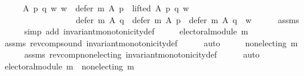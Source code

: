 \begin{isabellebody}
%
\isadelimproof
%
\endisadelimproof
%
\isatagproof
{}\isamarkupfalse%
\ {\isacharminus}{\kern0pt}\isanewline
\ \ \isamarkupfalse%
\ {\isachardoublequoteopen}{\isasymforall}A\ p\ q\ w{\isachardot}{\kern0pt}\ {\isacharparenleft}{\kern0pt}w\ {\isasymin}\ defer\ {\isacharparenleft}{\kern0pt}m{\isasymdown}{\isacharparenright}{\kern0pt}\ A\ p\ {\isasymand}\ lifted\ A\ p\ q\ w{\isacharparenright}{\kern0pt}\ {\isasymlongrightarrow}\isanewline
\ \ \ \ \ \ \ \ \ \ \ \ \ \ \ \ \ \ {\isacharparenleft}{\kern0pt}defer\ {\isacharparenleft}{\kern0pt}m{\isasymdown}{\isacharparenright}{\kern0pt}\ A\ q\ {\isacharequal}{\kern0pt}\ defer\ {\isacharparenleft}{\kern0pt}m{\isasymdown}{\isacharparenright}{\kern0pt}\ A\ p\ {\isasymor}\ defer\ {\isacharparenleft}{\kern0pt}m{\isasymdown}{\isacharparenright}{\kern0pt}\ A\ q\ {\isacharequal}{\kern0pt}\ {\isacharbraceleft}{\kern0pt}w{\isacharbraceright}{\kern0pt}{\isacharparenright}{\kern0pt}{\isachardoublequoteclose}\isanewline
\ \ \ \ \isamarkupfalse%
\ assms\isanewline
\ \ \ \ \isamarkupfalse%
\ {\isacharparenleft}{\kern0pt}simp\ add{\isacharcolon}{\kern0pt}\ invariant{\isacharunderscore}{\kern0pt}monotonicity{\isacharunderscore}{\kern0pt}def{\isacharparenright}{\kern0pt}\isanewline
\ \ \isamarkupfalse%
\ \isamarkupfalse%
\ {\isachardoublequoteopen}electoral{\isacharunderscore}{\kern0pt}module\ {\isacharparenleft}{\kern0pt}m{\isasymdown}{\isacharparenright}{\kern0pt}{\isachardoublequoteclose}\isanewline
\ \ \ \ \isamarkupfalse%
\ assms\ rev{\isacharunderscore}{\kern0pt}comp{\isacharunderscore}{\kern0pt}sound\ invariant{\isacharunderscore}{\kern0pt}monotonicity{\isacharunderscore}{\kern0pt}def\isanewline
\ \ \ \ \isamarkupfalse%
\ auto\isanewline
\ \ \isamarkupfalse%
\ \isamarkupfalse%
\ {\isachardoublequoteopen}non{\isacharunderscore}{\kern0pt}electing\ {\isacharparenleft}{\kern0pt}m{\isasymdown}{\isacharparenright}{\kern0pt}{\isachardoublequoteclose}\isanewline
\ \ \ \ \isamarkupfalse%
\ assms\ rev{\isacharunderscore}{\kern0pt}comp{\isacharunderscore}{\kern0pt}non{\isacharunderscore}{\kern0pt}electing\ invariant{\isacharunderscore}{\kern0pt}monotonicity{\isacharunderscore}{\kern0pt}def\isanewline
\ \ \ \ \isamarkupfalse%
\ auto\isanewline
\ \ \isamarkupfalse%
\ \isamarkupfalse%
\ {\isachardoublequoteopen}electoral{\isacharunderscore}{\kern0pt}module\ {\isacharparenleft}{\kern0pt}m{\isasymdown}{\isacharparenright}{\kern0pt}\ {\isasymand}\ non{\isacharunderscore}{\kern0pt}electing\ {\isacharparenleft}{\kern0pt}m{\isasymdown}{\isacharparenright}{\kern0pt}\ {\isasymand}\isanewline

\end{isabellebody}
